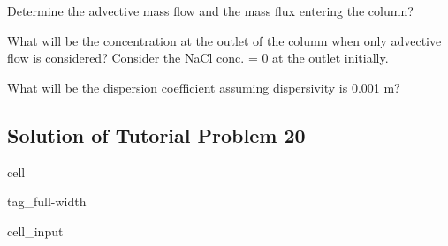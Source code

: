 \documentclass[letterpaper,10pt,english]{jupyterBook}
\begin{document}
\sphinxAtStartPar
{} Determine the advective mass flow and the mass flux entering the column?

\sphinxAtStartPar
{} What will be the concentration at the outlet of the column when only advective flow is considered? Consider the NaCl conc. = 0 at the outlet initially.

\sphinxAtStartPar
{} What will be the dispersion coefficient assuming dispersivity is 0.001 m?


\subsection{Solution of Tutorial Problem 20}
\label{\detokenize{content/tutorials/T8/tutorial_08:solution-of-tutorial-problem-20}}
\begin{sphinxuseclass}{cell}
\begin{sphinxuseclass}{tag_full-width}\begin{sphinxVerbatimInput}

\begin{sphinxuseclass}{cell_input}
\begin{sphinxVerbatim}[commandchars=\\\{\}]


   
   
   
   
   
   
   

   
   
   
   
  
   


\end{sphinxVerbatim}
\end{sphinxuseclass}
\end{sphinxVerbatimInput}
\end{sphinxuseclass}
\end{sphinxuseclass}
\end{document}
